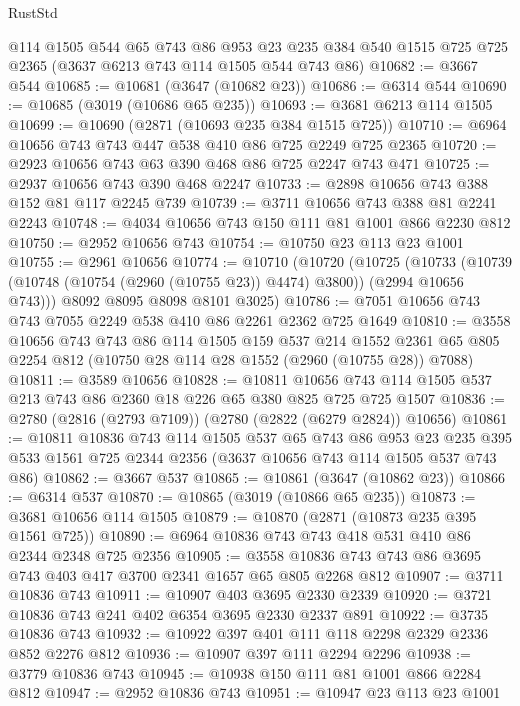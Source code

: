 \begin{lexlean}{RustStd}
\begin{coremodule}
    @114
    @1505
    @544
    @65
    @743
    @86
    @953
    @23
    @235
    @384
    @540
    @1515
    @725
    @725
    @2365
    (@3637 @6213 @743 @114 @1505 @544 @743 @86)
@10682 := @3667 @544
@10685 := @10681 (@3647 (@10682 @23))
@10686 := @6314 @544
@10690 := @10685 (@3019 (@10686 @65 @235))
@10693 := @3681 @6213 @114 @1505
@10699 := @10690 (@2871 (@10693 @235 @384 @1515 @725))
@10710 := @6964 @10656 @743 @743 @447 @538 @410 @86 @725 @2249 @725 @2365
@10720 := @2923 @10656 @743 @63 @390 @468 @86 @725 @2247 @743 @471
@10725 := @2937 @10656 @743 @390 @468 @2247
@10733 := @2898 @10656 @743 @388 @152 @81 @117 @2245 @739
@10739 := @3711 @10656 @743 @388 @81 @2241 @2243
@10748 := @4034 @10656 @743 @150 @111 @81 @1001 @866 @2230 @812
@10750 := @2952 @10656 @743
@10754 := @10750 @23 @113 @23 @1001
@10755 := @2961 @10656
@10774 := @10710
    (@10720
      (@10725
        (@10733 (@10739 (@10748 (@10754 (@2960 (@10755 @23)) @4474) @3800)) (@2994 @10656 @743)))
      @8092
      @8095
      @8098
      @8101
      @3025)
@10786 := @7051 @10656 @743 @743 @7055 @2249 @538 @410 @86 @2261 @2362 @725 @1649
@10810 := @3558
    @10656
    @743
    @743
    @86
    @114
    @1505
    @159
    @537
    @214
    @1552
    @2361
    @65
    @805
    @2254
    @812
    (@10750 @28 @114 @28 @1552 (@2960 (@10755 @28)) @7088)
@10811 := @3589 @10656
@10828 := @10811
    @10656
    @743
    @114
    @1505
    @537
    @213
    @743
    @86
    @2360
    @18
    @226
    @65
    @380
    @825
    @725
    @725
    @1507
@10836 := @2780 (@2816 (@2793 @7109)) (@2780 (@2822 (@6279 @2824)) @10656)
@10861 := @10811
    @10836
    @743
    @114
    @1505
    @537
    @65
    @743
    @86
    @953
    @23
    @235
    @395
    @533
    @1561
    @725
    @2344
    @2356
    (@3637 @10656 @743 @114 @1505 @537 @743 @86)
@10862 := @3667 @537
@10865 := @10861 (@3647 (@10862 @23))
@10866 := @6314 @537
@10870 := @10865 (@3019 (@10866 @65 @235))
@10873 := @3681 @10656 @114 @1505
@10879 := @10870 (@2871 (@10873 @235 @395 @1561 @725))
@10890 := @6964 @10836 @743 @743 @418 @531 @410 @86 @2344 @2348 @725 @2356
@10905 := @3558 @10836 @743 @743 @86 @3695 @743 @403 @417 @3700 @2341 @1657 @65 @805 @2268 @812
@10907 := @3711 @10836 @743
@10911 := @10907 @403 @3695 @2330 @2339
@10920 := @3721 @10836 @743 @241 @402 @6354 @3695 @2330 @2337 @891
@10922 := @3735 @10836 @743
@10932 := @10922 @397 @401 @111 @118 @2298 @2329 @2336 @852 @2276 @812
@10936 := @10907 @397 @111 @2294 @2296
@10938 := @3779 @10836 @743
@10945 := @10938 @150 @111 @81 @1001 @866 @2284 @812
@10947 := @2952 @10836 @743
@10951 := @10947 @23 @113 @23 @1001

\end{coremodule}
\end{lexlean}
